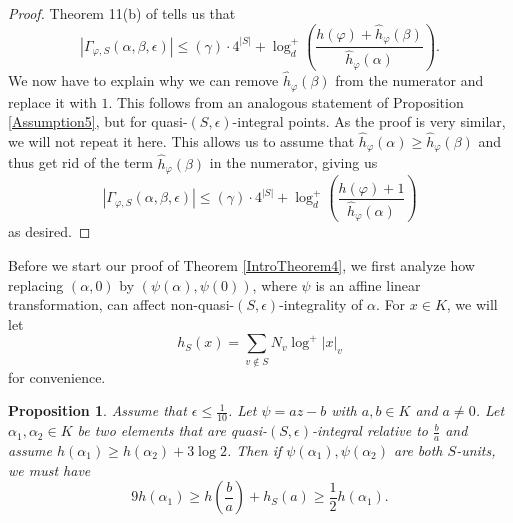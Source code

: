 \documentclass[10pt, reqno]{amsart}
\newcommand{\vphi}{\varphi}
\newcommand{\h}{\widehat{h}}
\numberwithin{theorem}{section}
\newtheorem{proposition}[theorem]{Proposition}
\numberwithin{equation}{section}
\numberwithin{example}{section}
\numberwithin{definition}{section}
\begin{document}
\begin{proof}
Theorem 11(b) of \cite{HS11} tells us that
$$|\Gamma_{\vphi,S}(\alpha,\beta,\epsilon)| \leq (\gamma) \cdot 4^{|S|} + \log^+_d \left(\frac{h(\vphi) + \h_{\vphi}(\beta)}{\h_{\vphi}(\alpha)}\right).$$
We now have to explain why we can remove $\h_{\vphi}(\beta)$ from the numerator and replace it with $1$. This follows from an analogous statement of Proposition \ref{Assumption5}, but for quasi-$(S,\epsilon)$-integral points. As the proof is very similar, we will not repeat it here. This allows us to assume that $\h_{\vphi}(\alpha) \geq \h_{\vphi}(\beta)$ and 
thus get rid of the term $\h_{\vphi}(\beta)$ in the numerator, giving us
$$|\Gamma_{\vphi,S}(\alpha,\beta,\epsilon)| \leq (\gamma) \cdot 4^{|S|} + \log^+_d \left(\frac{h(\vphi)+1}{\h_{\vphi}(\alpha)}\right)$$
as desired.
\end{proof}

Before we start our proof of Theorem \ref{IntroTheorem4}, we first analyze how replacing $(\alpha,0)$ by $(\psi(\alpha),\psi(0))$, where $\psi$ is an affine linear transformation, can affect non-quasi-$(S,\epsilon)$-integrality of $\alpha$. For $x \in K$, we will let 
$$h_S(x) = \sum_{v \not \in S} N_v \log^+|x|_v$$
for convenience. 
\begin{proposition} \label{Conjugacy1}
Assume that $\epsilon \leq \frac{1}{10}$. Let $\psi = az - b$ with $a,b \in K$ and $a \not = 0$. Let $\alpha_1,\alpha_2 \in K$ be two elements that are quasi-$(S,\epsilon)$-integral relative to $\frac{b}{a}$ and assume $h(\alpha_1) \geq h(\alpha_2) + 3 \log 2$. Then if $\psi(\alpha_1), \psi(\alpha_2)$ are both $S$-units, we must have
$$ 9 h(\alpha_1) \geq h\left(\frac{b}{a}\right) + h_S(a) \geq \frac{1}{2} h(\alpha_1).$$
\end{proposition}
\end{document}
